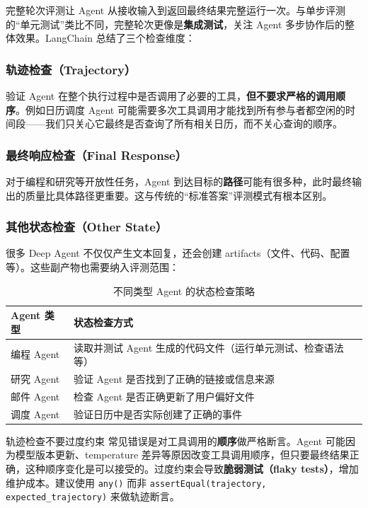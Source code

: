 \documentclass[a4paper]{article}
\begin{document}
完整轮次评测让 Agent 从接收输入到返回最终结果完整运行一次。与单步评测的``单元测试''类比不同，完整轮次更像是\textbf{集成测试}，关注 Agent 多步协作后的整体效果。LangChain 总结了三个检查维度：

\subsubsection{轨迹检查（Trajectory）}

验证 Agent 在整个执行过程中是否调用了必要的工具，\textbf{但不要求严格的调用顺序}。例如日历调度 Agent 可能需要多次工具调用才能找到所有参与者都空闲的时间段——我们只关心它最终是否查询了所有相关日历，而不关心查询的顺序。

\subsubsection{最终响应检查（Final Response）}

对于编程和研究等开放性任务，Agent 到达目标的\textbf{路径}可能有很多种，此时最终输出的质量比具体路径更重要。这与传统的``标准答案''评测模式有根本区别。

\subsubsection{其他状态检查（Other State）}

很多 Deep Agent 不仅仅产生文本回复，还会创建 artifacts（文件、代码、配置等）。这些副产物也需要纳入评测范围：

\begin{table}[H]
\centering
\caption{不同类型 Agent 的状态检查策略}
\begin{tabular}{lp{9cm}}
\toprule
\textbf{Agent 类型} & \textbf{状态检查方式} \\
\midrule
编程 Agent & 读取并测试 Agent 生成的代码文件（运行单元测试、检查语法等） \\
研究 Agent & 验证 Agent 是否找到了正确的链接或信息来源 \\
邮件 Agent & 检查 Agent 是否正确更新了用户偏好文件 \\
调度 Agent & 验证日历中是否实际创建了正确的事件 \\
\bottomrule
\end{tabular}
\end{table}

\begin{warningbox}{轨迹检查不要过度约束}
常见错误是对工具调用的\textbf{顺序}做严格断言。Agent 可能因为模型版本更新、temperature 差异等原因改变工具调用顺序，但只要最终结果正确，这种顺序变化是可以接受的。过度约束会导致\textbf{脆弱测试（flaky tests）}，增加维护成本。建议使用 \texttt{any()} 而非 \texttt{assertEqual(trajectory, expected\_trajectory)} 来做轨迹断言。
\end{warningbox}
\end{document}
